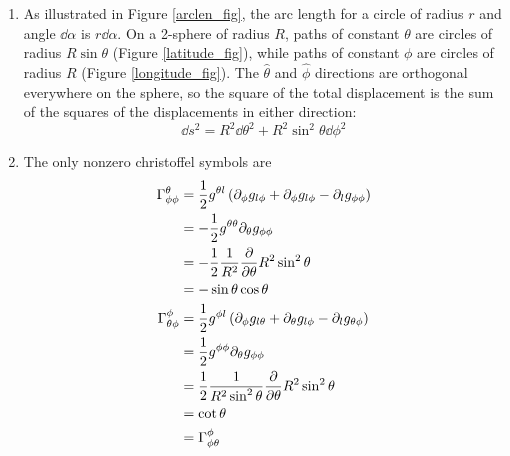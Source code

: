 \documentclass[12pt]{article}
\newcommand{\chrissym}[3]{\Gamma_{#2#3}^#1}
\newcommand{\partialg}[3]{\partial_{#1}g_{#2#3}}
\begin{document}
\begin{enumerate}[label=(\alph*)]
    \item As illustrated in Figure \ref{arclen_fig}, the arc length for a circle of radius $r$ and angle $\dd\alpha$ is $r\dd\alpha$. On a 2-sphere of radius $R$, paths of constant $\theta$ are circles of radius $R\sin\theta$ (Figure \ref{latitude_fig}), while paths of constant $\phi$ are circles of radius $R$ (Figure \ref{longitude_fig}). The $\hat{\theta}$ and $\hat{\phi}$ directions are orthogonal everywhere on the sphere, so the square of the total displacement is the sum of the squares of the displacements in either direction:
    \[ \dd s^2 = R^2\dd\theta^2 + R^2\sin^2\theta \dd\phi^2 \]
    \item The only nonzero christoffel symbols are
    \begin{align*}
        \chrissym{\theta}{\phi}{\phi} &= \frac{1}{2}g^{\theta l}\left(\partialg{\phi}{l}{\phi} + \partialg{\phi}{l}{\phi} - \partialg{l}{\phi}{\phi}\right) \\
        &= -\frac{1}{2}g^{\theta\theta}\partialg{\theta}{\phi}{\phi} \\
        &= -\frac{1}{2}\frac{1}{R^2}\pdv{\theta}R^2\sin^2\theta \\
        &= -\sin\theta\cos\theta \\
        \chrissym{\phi}{\theta}{\phi} &= \frac{1}{2}g^{\phi l}\left(\partialg{\phi}{l}{\theta} + \partialg{\theta}{l}{\phi} - \partialg{l}{\theta}{\phi}\right) \\
        &= \frac{1}{2}g^{\phi\phi}\partialg{\theta}{\phi}{\phi} \\
        &= \frac{1}{2}\frac{1}{R^2\sin^2\theta}\pdv{\theta}R^2\sin^2\theta \\
        &= \cot\theta \\
        &= \chrissym{\phi}{\phi}{\theta}
    \end{align*}
\end{enumerate}
\end{document}
